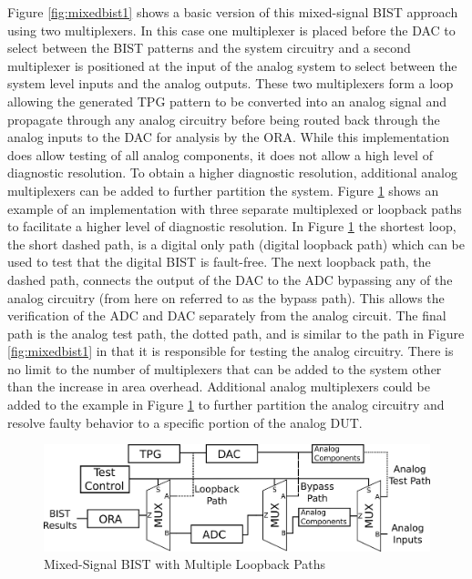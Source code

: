 \documentclass[12pt]{report}
\begin{document}
Figure \ref{fig:mixedbist1} shows a basic version of this mixed-signal BIST approach using two multiplexers.  In this case one multiplexer is placed before the DAC to select between the BIST patterns and the system circuitry and a second multiplexer is positioned at the input of the analog system to select between the system level inputs and the analog outputs.  These two multiplexers form a loop allowing the generated TPG pattern to be converted into an analog signal and propagate through any analog circuitry before being routed back through the analog inputs to the DAC for analysis by the ORA.  While this implementation does allow testing of all analog components, it does not allow a high level of diagnostic resolution\cite{syschip}.  To obtain a higher diagnostic resolution, additional analog multiplexers can be added to further partition the system. Figure \ref{fig:mixedbist_paths} shows an example of an implementation with three separate multiplexed or loopback paths to facilitate a higher level of diagnostic resolution.  In Figure \ref{fig:mixedbist_paths} the shortest loop, the short dashed path, is a digital only path (digital loopback path) which can be used to test that the digital BIST is fault-free.  The next loopback path, the dashed path, connects the output of the DAC to the ADC bypassing any of the analog circuitry (from here on referred to as the bypass path).  This allows the verification of the ADC and DAC separately from the analog circuit.  The final path is the analog test path, the dotted path, and is similar to the path in Figure \ref{fig:mixedbist1} in that it is responsible for testing the analog circuitry.  There is no limit to the number of multiplexers that can be added to the system other than the increase in area overhead\cite{syschip}.  Additional analog multiplexers could be added to the example in Figure \ref{fig:mixedbist_paths} to further partition the analog circuitry and resolve faulty behavior to a specific portion of the analog DUT.
\begin{figure}
	\begin{center}
		\includegraphics[scale=1]{images/mixedbist-paths}
	\end{center}
	\caption{Mixed-Signal BIST with Multiple Loopback Paths}
	\label{fig:mixedbist_paths}
\end{figure}
\end{document}

